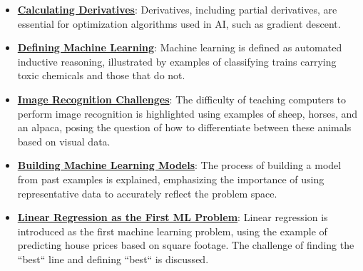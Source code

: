 \documentclass{article}%
\begin{document}
\begin{itemize}[leftmargin=*]
\item \href{https://purdue.brightspace.com/d2l/common/assets/pdfjs-d2l-dist/1.0.14-legacy/web/viewer.html?file=\%2Fcontent\%2Fenforced\%2F1095467-wl.202510.CS.24300.001\%2F04L1-Linear Algebra Primer.pdf\%3Fou\%3D1095467\&lang=en-us\&container=d2l-fileviewer-rendered-pdf\&fullscreen=d2l-fileviewer-rendered-pdf-dialog\&height=667#page=19}{\textbf{Calculating Derivatives}}: Derivatives, including partial derivatives, are essential for optimization algorithms used in AI, such as gradient descent.%
\end{itemize}%
\begin{itemize}[leftmargin=*]%
\item \href{https://purdue.brightspace.com/d2l/common/assets/pdfjs-d2l-dist/1.0.14-legacy/web/viewer.html?file=\%2Fcontent\%2Fenforced\%2F1095467-wl.202510.CS.24300.001\%2F05L2-ML Basics.pdf\%3Fou\%3D1095467\&lang=en-us\&container=d2l-fileviewer-rendered-pdf\&fullscreen=d2l-fileviewer-rendered-pdf-dialog\&height=667#page=3}{\textbf{Defining Machine Learning}}: Machine learning is defined as automated inductive reasoning, illustrated by examples of classifying trains carrying toxic chemicals and those that do not.%
\item \href{https://purdue.brightspace.com/d2l/common/assets/pdfjs-d2l-dist/1.0.14-legacy/web/viewer.html?file=\%2Fcontent\%2Fenforced\%2F1095467-wl.202510.CS.24300.001\%2F05L2-ML Basics.pdf\%3Fou\%3D1095467\&lang=en-us\&container=d2l-fileviewer-rendered-pdf\&fullscreen=d2l-fileviewer-rendered-pdf-dialog\&height=667#page=4}{\textbf{Image Recognition Challenges}}: The difficulty of teaching computers to perform image recognition is highlighted using examples of sheep, horses, and an alpaca, posing the question of how to differentiate between these animals based on visual data.%
\item \href{https://purdue.brightspace.com/d2l/common/assets/pdfjs-d2l-dist/1.0.14-legacy/web/viewer.html?file=\%2Fcontent\%2Fenforced\%2F1095467-wl.202510.CS.24300.001\%2F05L2-ML Basics.pdf\%3Fou\%3D1095467\&lang=en-us\&container=d2l-fileviewer-rendered-pdf\&fullscreen=d2l-fileviewer-rendered-pdf-dialog\&height=667#page=5}{\textbf{Building Machine Learning Models}}: The process of building a model from past examples is explained, emphasizing the importance of using representative data to accurately reflect the problem space.%
\item \href{https://purdue.brightspace.com/d2l/common/assets/pdfjs-d2l-dist/1.0.14-legacy/web/viewer.html?file=\%2Fcontent\%2Fenforced\%2F1095467-wl.202510.CS.24300.001\%2F05L2-ML Basics.pdf\%3Fou\%3D1095467\&lang=en-us\&container=d2l-fileviewer-rendered-pdf\&fullscreen=d2l-fileviewer-rendered-pdf-dialog\&height=667#page=6}{\textbf{Linear Regression as the First ML Problem}}: Linear regression is introduced as the first machine learning problem, using the example of predicting house prices based on square footage. The challenge of finding the ``best`` line and defining ``best`` is discussed.%

\end{itemize}
\end{document}
